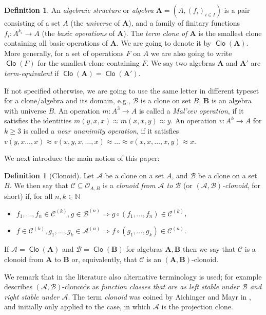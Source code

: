 \documentclass[11pt]{amsart}
\theoremstyle{plain}
\theoremstyle{definition}
\newtheorem{definition}[thm]{Definition}
\newcommand{\N}{{\mathbb N}}
\newcommand{\alg}[1]{\mathbf{#1}}
\newcommand{\clone}[1]{\mathcal{#1}}
\newcommand{\clonoid}[1]{\mathcal{#1}}
\newcommand{\clodC}{\clonoid{C}}
\newcommand{\clodO}{\clonoid{O}}
\newcommand{\algA}{\alg{A}}
\newcommand{\algB}{\alg{B}}
\newcommand{\cloA}{\clone{A}}
\newcommand{\cloB}{\clone{B}}
\DeclareMathOperator{\Clo}{\mathsf{Clo}}
\begin{document}
\begin{definition}
An \emph{algebraic structure} or \emph{algebra} $\algA = (A,(f_i)_{i\in I})$ is a pair consisting of a set $A$ (the \emph{universe} of $\algA$), and a family of finitary functions $f_i \colon A^{k_i} \to A$
(the \emph{basic operations} of $\algA$). The \emph{term clone of $\algA$} is the smallest clone containing all basic operations of $\algA$. We are going to denote it by $\Clo(\algA)$. More generally, for a set of operations $F$ on $A$ we are also going to write $\Clo(F)$ for the smallest clone containing $F$. We say two algebras $\algA$ and $\algA'$ are \emph{term-equivalent} if $\Clo(\algA) = \Clo(\algA')$.
\end{definition}

If not specified otherwise, we are going to use the same letter in different typeset for a clone/algebra and its domain, e.g., $\cloB$ is a clone on set $B$, $\algB$ is an algebra with universe $B$. An operation $m\colon A^3 \to A$ is called a \emph{Mal'cev operation}, if it satisfies the identities $m(y,x,x) \approx m(x,x,y) \approx y$. An operation $v \colon A^k \to A$ for $k \geq 3$ is called a \emph{near unanimity operation}, if it satisfies $v(y,x\ldots,x) \approx v(x,y,x, \ldots,x) \approx \ldots \approx v(x,x, \ldots, x,y) \approx x$.

We next introduce the main notion of this paper:

\begin{definition}[Clonoid]
Let $\cloA$ be a clone on a set $A$, and $\cloB$ be a clone on a set $B$. We then say that $\clodC \subseteq \clodO_{A,B}$ is a \emph{clonoid from $\cloA$ to $\cloB$} (or \emph{$(\cloA,\cloB)$-clonoid}, for short) if, for all $n,k \in \N$
\begin{itemize}
\item $f_1,\ldots,f_n \in \clodC^{(k)}, g\in \cloB^{(n)} \Rightarrow g\circ (f_1,\ldots,f_n) \in \clodC^{(k)}$,
\item $f \in \clodC^{(k)}, g_1,\ldots,g_k \in \cloA^{(n)} \Rightarrow f\circ (g_1,\ldots,g_k) \in \clodC^{(n)}$.
\end{itemize}
If $\cloA = \Clo(\algA)$ and $\cloB = \Clo(\algB)$ for algebras $\algA,\algB$ then we say that $\clodC$ is a clonoid from $\algA$ to $\algB$ or, equivalently, that $\clodC$ is an $(\algA, \algB)$-clonoid. 
\end{definition}

We remark that in the literature also alternative terminology is used; for example \cite{CF-clonoids} describes $(\cloA,\cloB)$-clonoids as \emph{function classes that are as left stable under $\cloB$ and right stable under $\cloA$}. The term \emph{clonoid} was coined by Aichinger and Mayr in \cite{AM-eqclasses}, and initially only applied to the case, in which $\cloA$ is the projection clone. 
\end{document}

